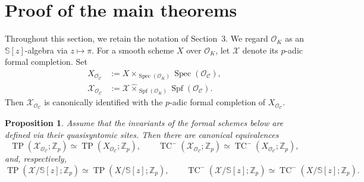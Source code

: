\documentclass[11pt]{amsart}
\newtheorem{proposition}[lemma]{Proposition}
\numberwithin{equation}{section}
\newcommand{\Z}{\mathbb{Z}}
\newcommand{\sC}{\mathcal{C}}
\newcommand{\sO}{\mathcal{O}}
\newcommand{\sX}{\mathcal{X}}
\newcommand{\Spec}{\operatorname{Spec}}
\newcommand{\Spf}{\operatorname{Spf}}
\numberwithin{equation}{section}
\newcommand{\TP}{\operatorname{TP}}
\newcommand{\TCn}{\operatorname{TC}^{-}}
\newcommand{\bS}{\mathbb{S}}
\begin{document}
\section{Proof of the main theorems}
Throughout this section, we retain the notation of Section~3. We regard $\sO_K$ as an $\bS [z]$-algebra via $z\mapsto \pi$. For a smooth scheme $X$ over $\sO_K$, let $\sX$ denote its $p$-adic formal completion. Set
\begin{align*}
X_{\sO_{\sC}}
&:= X \times_{\Spec(\sO_K)} \Spec(\sO_{\sC}), \\
\sX_{\sO_{\sC}}
&:= \sX \widehat{\times}_{\Spf(\sO_K)} \Spf(\sO_{\sC}).
\end{align*}
Then $\sX_{\sO_{\sC}}$ is canonically identified with the $p$-adic formal completion of $X_{\sO_{\sC}}$. 


\begin{proposition}\label{tptcformal}
Assume that the invariants of the formal schemes below are defined via their quasisyntomic sites. Then there are canonical equivalences
\[
\TP(\sX_{\sO_{\sC}};\Z_p)
\simeq
\TP(X_{\sO_{\sC}};\Z_p),
\qquad
\TCn(\sX_{\sO_{\sC}};\Z_p)
\simeq
\TCn(X_{\sO_{\sC}};\Z_p),
\]
and, respectively,
\[
\TP(\sX/\bS[z];\Z_p)
\simeq
\TP(X/\bS[z];\Z_p),
\qquad
\TCn(\sX/\bS[z];\Z_p)
\simeq
\TCn(X/\bS[z];\Z_p).
\]
\end{proposition}
\end{document}
